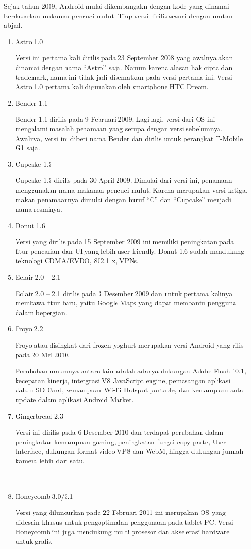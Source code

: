 \par Sejak tahun 2009, Android mulai dikembangakn dengan kode yang dinamai berdasarkan makanan pencuci mulut. Tiap versi dirilis sesuai dengan urutan abjad.
\begin{enumerate}
    \item Astro 1.0
    \par Versi ini pertama kali dirilis pada 23 September 2008 yang awalnya akan dinamai dengan nama “Astro” saja. Namun karena alasan hak cipta dan trademark, nama ini tidak jadi disematkan pada versi pertama ini. Versi Astro 1.0 pertama kali digunakan oleh smartphone HTC Dream.
    \item Bender 1.1
    \par Bender 1.1 dirilis pada 9 Februari 2009. Lagi-lagi, versi dari OS ini mengalami masalah penamaan yang serupa dengan versi sebelumnya. Awalnya, versi ini diberi nama Bender dan dirilis untuk perangkat T-Mobile G1 saja.
    \item Cupcake 1.5
    \par Cupcake 1.5 dirilis pada 30 April 2009. Dimulai dari versi ini, penamaan menggunakan nama makanan pencuci mulut. Karena merupakan versi ketiga, makan penamaannya dimulai dengan huruf “C” dan “Cupcake” menjadi nama resminya.
    \item Donut 1.6
    \par Versi yang dirilis pada 15 September 2009 ini memiliki peningkatan pada fitur pencarian dan UI yang lebih user friendly. Donut 1.6 sudah mendukung teknologi CDMA/EVDO, 802.1 x, VPNs.
    \item Eclair 2.0 – 2.1
    \par Eclair 2.0 – 2.1 dirilis pada 3 Desember 2009 dan untuk pertama kalinya membawa fitur baru, yaitu Google Maps yang dapat membantu pengguna dalam bepergian.
    \item Froyo 2.2
    \par Froyo atau disingkat dari frozen yoghurt merupakan versi Android yang rilis pada 20 Mei 2010.

\par Perubahan umumnya antara lain adalah adanya dukungan Adobe Flash 10.1, kecepatan kinerja, intergrasi V8 JavaScript engine, pemasangan aplikasi dalam SD Card, kemampuan Wi-Fi Hotspot portable, dan kemampuan auto update dalam aplikasi Android Market.

\item Gingerbread 2.3
\par Versi ini dirilis pada 6 Desember 2010 dan terdapat perubahan dalam peningkatan kemampuan gaming, peningkatan fungsi copy paste, User Interface, dukungan format video VP8 dan WebM, hingga dukungan jumlah kamera lebih dari satu.\\
\\
\\
\item Honeycomb 3.0/3.1
\par Versi yang diluncurkan pada 22 Februari 2011 ini merupakan OS yang didesain khusus untuk pengoptimalan penggunaan pada tablet PC. Versi Honeycomb ini juga mendukung multi prosesor dan akselerasi hardware untuk grafis.


\end{enumerate}
